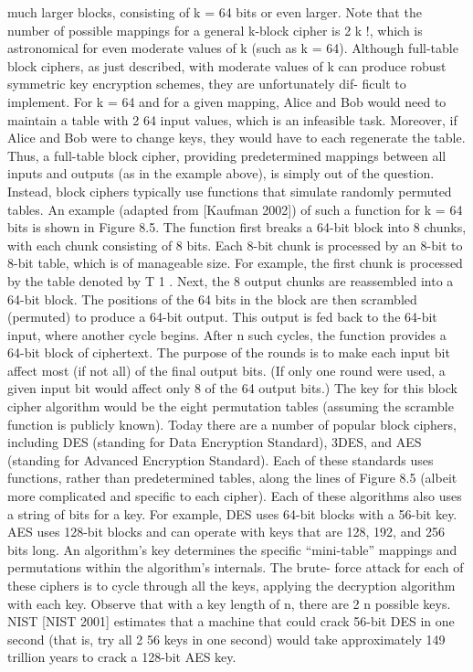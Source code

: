 \documentclass{report}
\theoremstyle{definition}
\begin{document}
{{{much larger blocks, consisting of k = 64 bits or even larger. Note that the number of
possible mappings for a general k-block cipher is 2 k !, which is astronomical for even
moderate values of k (such as k = 64).
Although full-table block ciphers, as just described, with moderate values of k
can produce robust symmetric key encryption schemes, they are unfortunately dif-
ficult to implement. For k = 64 and for a given mapping, Alice and Bob would need to
maintain a table with 2 64 input values, which is an infeasible task. Moreover, if Alice
and Bob were to change keys, they would have to each regenerate the table. Thus,
a full-table block cipher, providing predetermined mappings between all inputs and
outputs (as in the example above), is simply out of the question.
Instead, block ciphers typically use functions that simulate randomly permuted
tables. An example (adapted from [Kaufman 2002]) of such a function for k = 64 bits
is shown in Figure 8.5. The function first breaks a 64-bit block into 8 chunks, with
each chunk consisting of 8 bits. Each 8-bit chunk is processed by an 8-bit to 8-bit
table, which is of manageable size. For example, the first chunk is processed by the
table denoted by T 1 . Next, the 8 output chunks are reassembled into a 64-bit block.
The positions of the 64 bits in the block are then scrambled (permuted) to produce a
64-bit output. This output is fed back to the 64-bit input, where another cycle begins.
After n such cycles, the function provides a 64-bit block of ciphertext. The purpose
of the rounds is to make each input bit affect most (if not all) of the final output bits.
(If only one round were used, a given input bit would affect only 8 of the 64 output
bits.) The key for this block cipher algorithm would be the eight permutation tables
(assuming the scramble function is publicly known).
Today there are a number of popular block ciphers, including DES (standing
for Data Encryption Standard), 3DES, and AES (standing for Advanced Encryption Standard). Each of these standards uses functions, rather than predetermined tables,
along the lines of Figure 8.5 (albeit more complicated and specific to each cipher).
Each of these algorithms also uses a string of bits for a key. For example, DES uses
64-bit blocks with a 56-bit key. AES uses 128-bit blocks and can operate with keys
that are 128, 192, and 256 bits long. An algorithm’s key determines the specific
“mini-table” mappings and permutations within the algorithm’s internals. The brute-
force attack for each of these ciphers is to cycle through all the keys, applying the
decryption algorithm with each key. Observe that with a key length of n, there are 2 n
possible keys. NIST [NIST 2001] estimates that a machine that could crack 56-bit
DES in one second (that is, try all 2 56 keys in one second) would take approximately 149
trillion years to crack a 128-bit AES key.\newline

}}}
\end{document}
